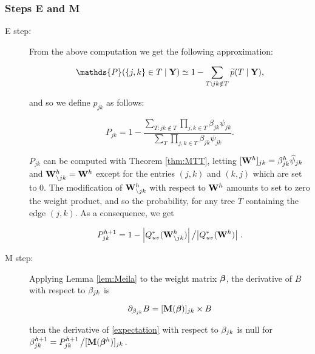 \subsubsection*{Steps E and M}
\begin{description}
 \item[E step:]
From the above computation we get the following approximation:
 
\begin{linenomath*}
$$\mathds{P}(\{j,k\}\in T  \mid \Yb) \simeq 1 - \sum_{T:jk\notin T} \pt(T \mid \Yb),$$
\end{linenomath*}
and so we define $p_{jk}$ as follows: \begin{linenomath*}
$$P_{jk}= 1 - \frac{\sum_{T:jk\notin T} \prod_{j, k \in T} \beta_{jk} \psi_{jk}}{\sum_T \prod_{j, k \in T} \beta_{jk} \psi_{jk}}.$$
 \end{linenomath*}
 $P_{jk}$ can be computed with Theorem \ref{thm:MTT}, letting $[{\bf W}^h]_{jk} = \beta^h_{jk} \widehat{\psi}_{jk}$ and ${\bf W}^h_{\setminus {jk}} = {\bf W}^h$ except for the entries $(j, k)$ and $(k, j)$ which are set to 0. The modification of ${\bf W}^h_{\setminus {jk}}$ with respect to ${\bf W}^h$ amounts to set to zero the weight product, and so the probability, for any tree $T$ containing the edge $(j, k)$. As a consequence, we get
\begin{linenomath*} 
$$
 P^{h+1}_{jk} = 1 - \left|Q_{uv}^*({\bf W}^h_{\setminus {jk}})\right| \left/ \left|Q_{uv}^*({\bf W}^h)\right| \right..
 $$
 \end{linenomath*}
 \item[M step:] Applying Lemma \ref{lem:Meila} to the weight matrix ${\boldsymbol{\beta}}$, the derivative of $B$ with respect to $\beta_{jk}$ is 
\begin{linenomath*}
$$
 \partial_{\beta_{jk}} B = [{\bf M}({\boldsymbol{\beta}})]_{jk} \times B
 $$
 \end{linenomath*}
 then the derivative of \eqref{expectation} with respect to $\beta_{jk}$ is null for
 $\beta^{h+1}_{jk} = P_{jk}^{h+1} \left/ [{\bf M}({\boldsymbol{\beta}}^h)]_{jk} \right.$.
\end{description}
